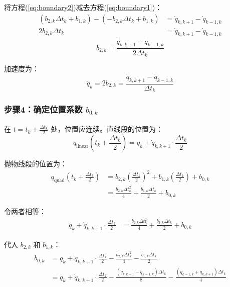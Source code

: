 \documentclass[12pt,a4paper]{article}
\begin{document}
将方程(\ref{eq:boundary2})减去方程(\ref{eq:boundary1})：
\begin{align*}
(b_{2,k}\Delta t_k + b_{1,k}) - (-b_{2,k}\Delta t_k + b_{1,k}) &= \dot{q}_{k,k+1} - \dot{q}_{k-1,k} \\
2b_{2,k}\Delta t_k &= \dot{q}_{k,k+1} - \dot{q}_{k-1,k}
\end{align*}
\begin{equation}
\boxed{
b_{2,k} = \frac{\dot{q}_{k,k+1} - \dot{q}_{k-1,k}}{2\Delta t_k}
}
\label{eq:b2}
\end{equation}

加速度为：
\begin{equation}
\ddot{q}_k = 2b_{2,k} = \frac{\dot{q}_{k,k+1} - \dot{q}_{k-1,k}}{\Delta t_k}
\label{eq:acceleration}
\end{equation}

\subsubsection{步骤4：确定位置系数 $b_{0,k}$}

在 $t = t_k + \frac{\Delta t_k}{2}$ 处，位置应连续。直线段的位置为：
\begin{equation}
q_{\text{linear}}(t_k + \frac{\Delta t_k}{2}) = q_k + \dot{q}_{k,k+1} \cdot \frac{\Delta t_k}{2}
\label{eq:linear_position}
\end{equation}

抛物线段的位置为：
\begin{align}
q_{\text{quad}}(t_k + \frac{\Delta t_k}{2}) &= b_{2,k}(\frac{\Delta t_k}{2})^2 + b_{1,k}(\frac{\Delta t_k}{2}) + b_{0,k} \nonumber \\
&= \frac{b_{2,k}\Delta t_k^2}{4} + \frac{b_{1,k}\Delta t_k}{2} + b_{0,k}
\label{eq:quad_position}
\end{align}

令两者相等：
\begin{align*}
q_k + \dot{q}_{k,k+1} \cdot \frac{\Delta t_k}{2} &= \frac{b_{2,k}\Delta t_k^2}{4} + \frac{b_{1,k}\Delta t_k}{2} + b_{0,k}
\end{align*}

代入 $b_{2,k}$ 和 $b_{1,k}$：
\begin{align*}
b_{0,k} &= q_k + \dot{q}_{k,k+1} \cdot \frac{\Delta t_k}{2} - \frac{b_{2,k}\Delta t_k^2}{4} - \frac{b_{1,k}\Delta t_k}{2} \\
&= q_k + \dot{q}_{k,k+1} \cdot \frac{\Delta t_k}{2} - \frac{(\dot{q}_{k,k+1} - \dot{q}_{k-1,k})\Delta t_k}{8} - \frac{(\dot{q}_{k-1,k} + \dot{q}_{k,k+1})\Delta t_k}{4}
\end{align*}
\end{document}
